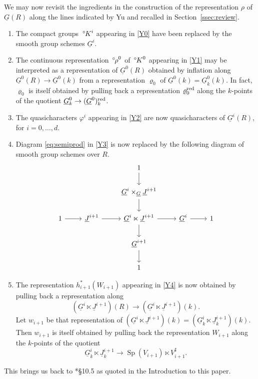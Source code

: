 \documentclass[10pt]{amsart}
\makeatletter
\theoremstyle{plain}
\theoremstyle{definition}
\newcommand{\Fq}{k}
\newcommand{\labitem}[2]{
\def\@itemlabel{\textbf{#1}}
\item
\def\@currentlabel{#1}\label{#2}}
\newcommand{\Sp}{{\operatorname{Sp}}}
\newcommand{\oK}{{\,^\circ \hskip-1pt K}}
\newcommand{\orho}{{\,^\circ \hskip-1pt \rho}}
\makeatother
\begin{document}
We may now revisit the ingredients in the construction of the representation $\rho$ of $\underline{G}(R)$ along the lines indicated by Yu and recalled in Section~\ref{ssec:review}.
\begin{enumerate}
\labitem{M0}{M0}
The compact groups $\oK^i$ appearing in \ref{Y0} have been replaced by the smooth group schemes $\underline{G}^i$.
\labitem{M1}{M1}
The continuous representation $\orho^0$ of $\oK^0$ appearing in \ref{Y1} may be interpreted as a representation of $\underline{G}^0(R)$ obtained by inflation along $\underline{G}^0(R) \to \underline{G}^0(\Fq)$ from a representation $\varrho_0$ of $\underline{G}^0(\Fq) = \underline{G}^0_\Fq(\Fq)$.
In fact, $\varrho_0$ is itself obtained by pulling back a representation $\varrho_0^{\operatorname{red}}$ along the $\Fq$-points of the quotient $\underline{G}^0_\Fq \to (\underline{G}^0)_\Fq^\reductive$.
\labitem{M2}{M2} The quasicharacters $\varphi^i$ appearing in \ref{Y2} are now quasicharacters of $\underline{G}^i(R)$, for $i=0, \ldots, d$.
\labitem{M3}{M3}
Diagram \eqref{eq:semiprod} in \ref{Y3} is now replaced by the following diagram of smooth group schemes over $R$.
\begin{equation}\label{eq:pimodel}
\begin{tikzcd}
\ && 1 \arrow{d} && \\
\ && \underline{G}^{i}\times_{\underline{G}} \underline{J}^{i+1}\arrow{d} && \\
1 \arrow{r} & \underline{J}^{i+1} \arrow{r} & \underline{G}^i \ltimes \underline{J}^{i+1} \arrow{d} \arrow{r} & \underline{G}^i \arrow{r} & 1\\
&& \underline{G}^{i+1} \arrow{d} && \\
&& 1 &&
\end{tikzcd}
\end{equation}
\labitem{M4}{M4}
The representation $h_{i+1}^*(W_{i+1})$ appearing in \ref{Y4} is now obtained by pulling back a representation along 
\[
(\underline{G}^i \ltimes \underline{J}^{i+1})(R) \to (\underline{G}^i \ltimes \underline{J}^{i+1})(\Fq).
\]
Let $w_{i+1}$ be that representation of $(\underline{G}^i \ltimes \underline{J}^{i+1})(\Fq) = (\underline{G}_\Fq^i \ltimes \underline{J}^{i+1}_\Fq)(\Fq)$. 
Then $w_{i+1}$ is itself obtained by pulling back the representation $W_{i+1}$ along the $\Fq$-points of the quotient
\[
\underline{G}_\Fq^i \ltimes \underline{J}^{i+1}_\Fq \to 
\Sp(V_{i+1}) \ltimes V_{i+1}^\sharp.
\]
\end{enumerate}

This brings us back to \cite{Yu:models}*{\S 10.5} as quoted in the Introduction to this paper.
\end{document}
